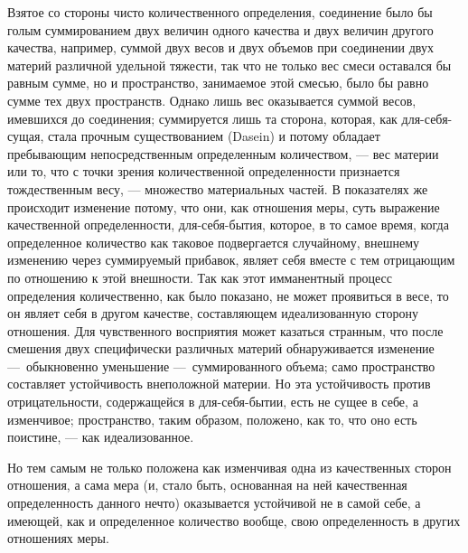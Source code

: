 Взятое со стороны чисто количественного определения, соединение было бы
голым суммированием двух величин одного качества и двух величин другого
качества, например, суммой двух весов и двух объемов при соединении двух
материй различной удельной тяжести, так что не только вес смеси оставался
бы равным сумме, но и пространство, занимаемое этой смесью, было бы равно
сумме тех двух пространств. Однако лишь вес оказывается суммой весов,
имевшихся до соединения; суммируется лишь та сторона, которая, как
для-себя-сущая, стала прочным существованием (Dasein) и потому обладает
пребывающим непосредственным определенным количеством, — вес материи или
то, что с точки зрения количественной определенности признается
тождественным весу, — множество материальных частей. В показателях же
происходит изменение потому, что они, как отношения меры, суть выражение
качественной определенности, для-себя-бытия, которое, в то самое время,
когда определенное количество как таковое подвергается случайному, внешнему
изменению через суммируемый прибавок, являет себя вместе с тем отрицающим
по отношению к этой внешности. Так как этот имманентный процесс определения
количественно, как было показано, не может проявиться в весе, то он являет
себя в другом качестве, составляющем идеализованную сторону отношения. Для
чувственного восприятия может казаться странным, что после смешения двух
специфически различных материй обнаруживается изменение —~обыкновенно
уменьшение —~суммированного объема; само пространство составляет
устойчивость внеположной материи. Но эта устойчивость против
отрицательности, содержащейся в для-себя-бытии, есть не сущее в себе, а
изменчивое; пространство, таким образом, положено, как то, что оно есть
поистине, — как идеализованное.

Но тем самым не только положена как изменчивая одна из качественных сторон
отношения, а сама мера (и, стало быть, основанная на ней качественная
определенность данного нечто) оказывается устойчивой не в самой себе, а
имеющей, как и определенное количество вообще, свою определенность в других
отношениях меры.

